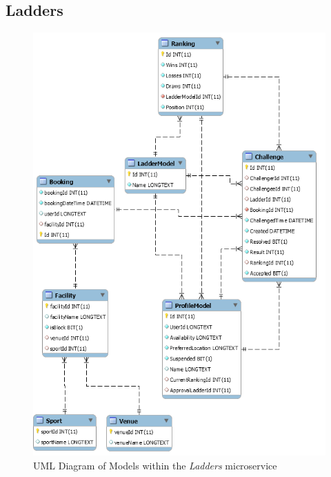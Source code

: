 \subsection{Ladders}
\begin{figure}[H]
    \centering
    \includegraphics[width=\textwidth]{Images/db_uml/ladders.png}
    \caption{UML Diagram of Models within the \textit{Ladders} microservice}
    \label{fig:db_uml:ladders}
\end{figure}

